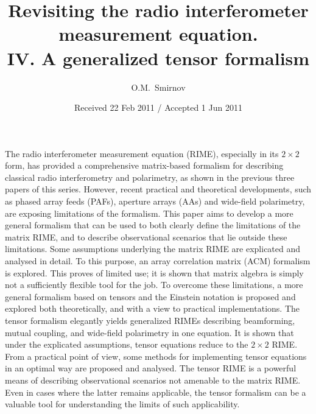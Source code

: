 \documentclass[]{aa}
\newcommand{\EDIT}[1]{#1}
\begin{document}
\title{Revisiting the radio interferometer measurement equation.\\IV. A generalized tensor formalism}

\author{O.M.\ Smirnov}


\date{Received 22 Feb 2011 / Accepted 1 Jun 2011}


\abstract%
{The radio interferometer measurement equation (RIME), especially in its $2\times2$ form, has provided a \EDIT{comprehensive matrix-based formalism for describing classical radio interferometry and polarimetry}, as shown in the previous three papers of this series. However, recent practical and theoretical developments, such as phased array feeds (PAFs), aperture arrays (AAs) and wide-field polarimetry, are exposing limitations of the formalism.
}
{This paper aims to develop a more general formalism that can be used to both clearly define the limitations of the matrix RIME, and
to describe observational scenarios that lie outside these limitations.
}
{Some assumptions underlying the matrix RIME are explicated and analysed in detail. To this purpose, an array correlation matrix (ACM) formalism is explored. This proves of limited use; it is shown that matrix algebra is simply not a sufficiently flexible tool for the job. To overcome these limitations, a more general formalism based on tensors and the Einstein notation is proposed and explored both theoretically, and with a view to practical implementations.
}%
{The tensor formalism elegantly yields generalized RIMEs describing beamforming, mutual coupling, and wide-field polarimetry in one equation. It is shown that under the explicated assumptions, tensor equations reduce to the $2\times2$ RIME. From a practical point of view, some methods for implementing tensor equations in an optimal way are proposed and analysed.
}%
{The tensor RIME is a powerful means of describing observational scenarios not amenable to the matrix RIME. Even in cases where the latter 
remains applicable, the tensor formalism can be a valuable tool for understanding the limits of such applicability.
}
\end{document}
